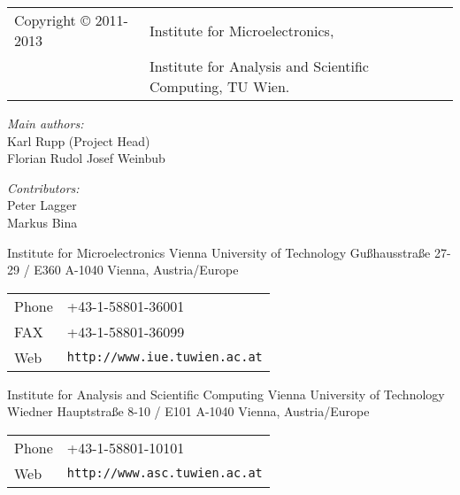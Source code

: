 
\clearpage

\begin{tabular}{ll}
Copyright {\copyright} 2011-2013 & Institute for Microelectronics, \\
                            & Institute for Analysis and Scientific Computing, TU Wien.
\end{tabular}

\vspace{2.5cm}

\textit{Main authors:}\\ 

Karl Rupp (Project Head)\\
Florian Rudol
Josef Weinbub \\

\vspace{1cm}

\textit{Contributors:}\\ 

Peter Lagger \\
Markus Bina


\vspace{3.0cm}

Institute for Microelectronics\newline
Vienna University of Technology\newline
Gu\ss hausstra\ss e 27-29 / E360\newline
A-1040 Vienna, Austria/Europe\newline

\begin{tabular}{ll}
Phone  & +43-1-58801-36001\\
FAX    & +43-1-58801-36099\\
Web    & \texttt{http://www.iue.tuwien.ac.at}
\end{tabular}

\vspace{1.5cm}

Institute for Analysis and Scientific Computing\newline
Vienna University of Technology\newline
Wiedner Hauptstra\ss e 8-10 / E101\newline
A-1040 Vienna, Austria/Europe\newline

\begin{tabular}{ll}
Phone  & +43-1-58801-10101\\
Web    & \texttt{http://www.asc.tuwien.ac.at}
\end{tabular}




